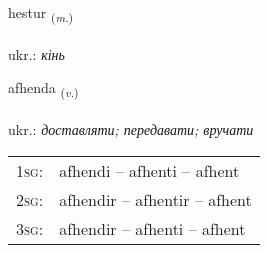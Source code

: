 \documentclass[frontgrid, backgrid]{flacards}\usepackage[]{graphicx}\usepackage[]{xcolor}
\begin{document}
\renewcommand{\flhead}{\vskip5pt \fboxsep=0pt {\small\bfseries\footnotesize Nafnorð | іменник}}
\renewcommand{\fcfoot}{\vskip5pt \fboxsep=0pt \hspace{2pt}{\small\bfseries\footnotesize 2K}}

\renewcommand{\blhead}{\vskip5pt {\small\bfseries\footnotesize Nafnorð | іменник }}
\renewcommand{\bcfoot}{\vskip5pt \hspace{2pt}{\small\bfseries\footnotesize 2K}}


{hestur \small{\textsubscript{(\textit{m.})}} \\[1ex] %
\textphonetic{[hɛstʏr]} \\
ukr.: \emph{кінь} \\  [2ex]
\renewcommand*{\arraystretch}{0.8}
}

\renewcommand{\flhead}{\vskip5pt \fboxsep=0pt {\small\bfseries\footnotesize Sagnorð | дієслово}}
\renewcommand{\fcfoot}{\vskip5pt \fboxsep=0pt \hspace{2pt}{\small\bfseries\footnotesize 2K}}

\renewcommand{\blhead}{\vskip5pt {\small\bfseries\footnotesize Sagnorð | дієслово }}
\renewcommand{\bcfoot}{\vskip5pt \hspace{2pt}{\small\bfseries\footnotesize 2K}}


{afhenda \small{\textsubscript{(\textit{v.})}} \\[1ex] %
\textphonetic{[afhɛnta]} \\
ukr.: \emph{доставляти; передавати; вручати} \\  [2ex]
\renewcommand*{\arraystretch}{0.8}
\begin{tabular}{p{1cm}l}
\textsc{1sg}: & afhendi -- afhenti -- afhent \\ 
\textsc{2sg}: & afhendir -- afhentir -- afhent \\ 
\textsc{3sg}: & afhendir -- afhenti -- afhent \\ 
\end{tabular}
}
\end{document}
